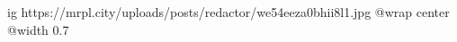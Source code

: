  
 
 
 
 

\ifcmt
  ig https://mrpl.city/uploads/posts/redactor/we54eeza0bhii8l1.jpg
  @wrap center
  @width 0.7
\fi
